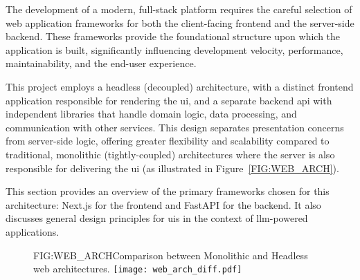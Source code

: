 The development of a modern, full-stack platform requires the careful selection of web application frameworks for both the client-facing frontend and the server-side backend. These frameworks provide the foundational structure upon which the application is built, significantly influencing development velocity, performance, maintainability, and the end-user experience.

This project employs a headless (decoupled) architecture, with a distinct frontend application responsible for rendering the \acl{ui}, and a separate backend \acs{api} with independent libraries that handle domain logic, data processing, and communication with other services. This design separates presentation concerns from server-side logic, offering greater flexibility and scalability compared to traditional, monolithic (tightly-coupled) architectures where the server is also responsible for delivering the \acl{ui} (as illustrated in Figure~\ref{FIG:WEB_ARCH}). 

This section provides an overview of the primary frameworks chosen for this architecture: Next.js for the frontend and FastAPI for the backend. It also discusses general design principles for \aclp{ui} in the context of \ac{llm}-powered applications.

\begin{figure}[Comparison of Tightly-Coupled and Decoupled Web Architectures]{FIG:WEB_ARCH}{Comparison between Monolithic and Headless web architectures.}
    \centering
    \texttt{[image: web\_arch\_diff.pdf]}
\end{figure}